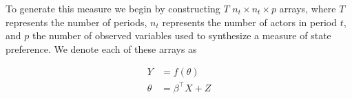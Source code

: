 To generate this measure we begin by constructing $T$ $n_{t} \times n_{t} \times p$ arrays, where $T$ represents the number of periods, $n_{t}$ represents the number of actors in period $t$, and $p$ the number of observed variables used to synthesize a measure of state preference. We denote each of these arrays as

\begin{align*}
	Y &= f(\theta) \\
	\theta &= \beta^{\top} X + Z
\end{align*}








